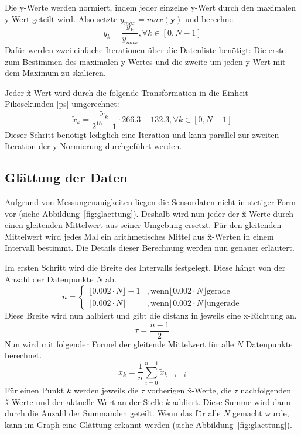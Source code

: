 Die y-Werte werden normiert, indem jeder einzelne y-Wert durch den maximalen y-Wert geteilt wird.
Also setzte $y_{max} = max(\bm{y})$ und berechne
\[
    y_k = \frac{y_k}{y_{max}}, \forall k \in [0, N - 1]
\]
Dafür werden zwei einfache Iterationen über die Datenliste benötigt:
Die erste zum Bestimmen des maximalen y-Wertes und die zweite um jeden y-Wert mit dem Maximum zu skalieren.

Jeder \~x-Wert wird durch die folgende Transformation in die Einheit Pikosekunden [ps] umgerechnet:
\[
    \tilde{x}_k = \frac{\tilde{x}_k}{2^{18} - 1} \cdot 266.3 - 132.3, \forall k \in [0, N - 1]
\]
Dieser Schritt benötigt lediglich eine Iteration und kann parallel zur zweiten Iteration der y-Normierung durchgeführt werden.

\subsection{Glättung der Daten}\label{subsec:glaettung}
Aufgrund von Messungenauigkeiten liegen die Sensordaten nicht in stetiger Form vor (siehe Abbildung~\ref{fig:glaettung}).
Deshalb wird nun jeder der \~x-Werte durch einen gleitenden Mittelwert aus seiner Umgebung ersetzt.
Für den gleitenden Mittelwert wird jedes Mal ein arithmetisches Mittel aus \~x-Werten in einem Intervall bestimmt.
Die Details dieser Berechnung werden nun genauer erläutert.

Im ersten Schritt wird die Breite des Intervalls festgelegt.
Diese hängt von der Anzahl der Datenpunkte $N$ ab.
\[
    n =
    \begin{cases}
        \lfloor0.002 \cdot N \rfloor - 1 & , \text{wenn} \lfloor0.002 \cdot N \rfloor \text{gerade} \\
        \lfloor0.002 \cdot N \rfloor     & , \text{wenn} \lfloor0.002 \cdot N \rfloor \text{ungerade}
    \end{cases}
\]
Diese Breite wird nun halbiert und gibt die distanz in jeweils eine x-Richtung an.
\[
    \tau = \frac{n - 1}{2}
\]
Nun wird mit folgender Formel der gleitende Mittelwert für alle $N$ Datenpunkte berechnet.
\[
    x_k = \frac{1}{n} \sum_{i = 0}^{n - 1} \tilde{x}_{k-\tau+i}
\]
Für einen Punkt $k$ werden jeweils die $\tau$ vorherigen \~x-Werte, die $\tau$ nachfolgenden \~x-Werte und der aktuelle Wert an der Stelle $k$ addiert.
Diese Summe wird dann durch die Anzahl der Summanden geteilt.
Wenn das für alle $N$ gemacht wurde, kann im Graph eine Glättung erkannt werden (siehe Abbildung~\ref{fig:glaettung}).

